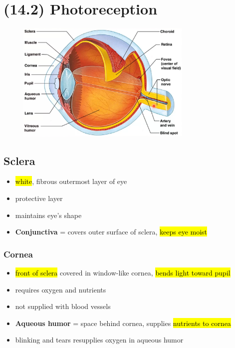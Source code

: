 \documentclass[a4paper,12pt]{article}
\begin{document}
\pagebreak

\section{(14.2) Photoreception}

\begin{figure}[H]
    \centering
    \includegraphics[width=0.75\textwidth]{eye}
\end{figure}

\subsection{Sclera}
\begin{itemize}
    \item{\hl{white}, fibrous outermost layer of eye}
    \item{protective layer}
    \item{maintains eye's shape}
    \item{\textbf{Conjunctiva} = covers outer surface of sclera, \hl{keeps eye moist}}
\end{itemize}

\subsubsection{Cornea}
\begin{itemize}
    \item{\hl{front of sclera} covered in window-like cornea, \hl{bends light toward pupil}}
    \item{requires oxygen and nutrients}
    \item{not supplied with blood vessels}
    \item{\textbf{Aqueous humor} = space behind cornea, supplies \hl{nutrients to cornea}}
    \item{blinking and tears resupplies oxygen in aqueous humor}
\end{itemize}
\end{document}

